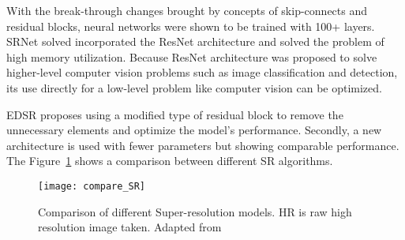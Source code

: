With the break-through changes brought by concepts of skip-connects and residual blocks, neural networks were shown to be trained with 100+ layers. SRNet solved incorporated the ResNet architecture and solved the problem of high memory utilization. Because ResNet architecture was proposed to solve higher-level computer vision problems such as image classification and detection, its use directly for a low-level problem like computer vision can be optimized.

EDSR proposes using a modified type of residual block to remove the unnecessary elements and optimize the model's performance. Secondly, a new architecture is used with fewer parameters but showing comparable performance. The Figure~\ref{fig:compare_SR} shows a comparison between different SR algorithms.

\begin{figure}
  \centering
  \texttt{[image: compare\_SR]}
  \caption[Comparison of different Super-resolution models.]{Comparison of different Super-resolution models. HR is raw high resolution image taken. Adapted from \cite{EDSR}}
  \label{fig:compare_SR}
\end{figure}

